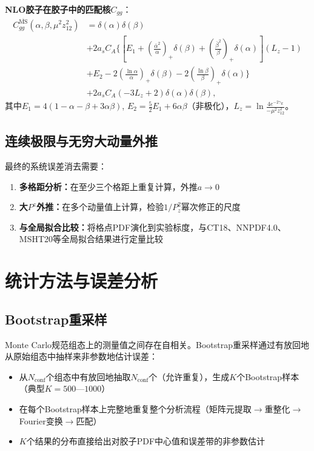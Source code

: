 \documentclass[12pt,a4paper]{ctexart}
\theoremstyle{definition}
\begin{document}
\textbf{NLO胶子在胶子中的匹配核$C_{gg}$}\cite{Yao2023}：
\begin{equation}
\begin{aligned}
C^{\overline{\text{MS}}}_{gg}(\alpha, \beta, \mu^2 z^2_{12}) &= \delta(\alpha)\delta(\beta) \\
&+ 2a_s C_A \Bigg\{ \left[E_1 + \left(\frac{\bar{\alpha}^2}{\alpha}\right)_+ \delta(\beta) + \left(\frac{\bar{\beta}^2}{\beta}\right)_+ \delta(\alpha)\right](L_z - 1) \\
&+ E_2 - 2\left(\frac{\ln\alpha}{\alpha}\right)_+ \delta(\beta) - 2\left(\frac{\ln\beta}{\beta}\right)_+ \delta(\alpha) \Bigg\} \\
&+ 2a_s C_A (-3L_z + 2)\delta(\alpha)\delta(\beta),
\end{aligned}
\end{equation}
其中$E_1=4(1-\alpha-\beta+3\alpha\beta)$, $E_2=\frac{5}{2}E_1+6\alpha\beta$（非极化），$L_z=\ln\frac{4e^{-2\gamma_E}}{-\mu^2 z^2_{12}}$。

\subsection{连续极限与无穷大动量外推}

最终的系统误差消去需要\cite{Chen2025gluon}：
\begin{enumerate}
    \item \textbf{多格距分析：}在至少三个格距上重复计算，外推$a\to 0$
    \item \textbf{大$P^z$外推：}在多个动量值上计算，检验$1/P_z^2$幂次修正的尺度
    \item \textbf{与全局拟合比较：}将格点PDF演化到实验标度，与CT18、NNPDF4.0、MSHT20等全局拟合结果进行定量比较
\end{enumerate}

\section{统计方法与误差分析}

\subsection{Bootstrap重采样}

Monte Carlo规范组态上的测量值之间存在自相关。Bootstrap重采样\cite{Gattringer2010,本库补充6}通过有放回地从原始组态中抽样来非参数地估计误差：
\begin{itemize}
    \item 从$N_{\text{conf}}$个组态中有放回地抽取$N_{\text{conf}}$个（允许重复），生成$K$个Bootstrap样本（典型$K=500$—$1000$）
    \item 在每个Bootstrap样本上完整地重复整个分析流程（矩阵元提取$\to$重整化$\to$Fourier变换$\to$匹配）
    \item $K$个结果的分布直接给出对胶子PDF中心值和误差带的非参数估计
\end{itemize}
\end{document}
